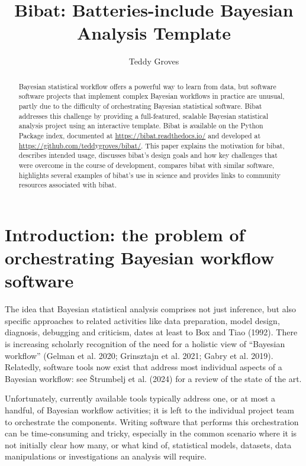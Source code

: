 \documentclass[
  letterpaper,
  DIV=11,
  numbers=noendperiod]{scrartcl}
\title{Bibat: Batteries-include Bayesian Analysis Template}
\author{Teddy Groves}
\date{}
\begin{document}
\maketitle
\begin{abstract}
Bayesian statistical workflow offers a powerful way to learn from data,
but software software projects that implement complex Bayesian workflows
in practice are unusual, partly due to the difficulty of orchestrating
Bayesian statistical software. Bibat addresses this challenge by
providing a full-featured, scalable Bayesian statistical analysis
project using an interactive template. Bibat is available on the Python
Package index, documented at \url{https://bibat.readthedocs.io/} and
developed at \url{https://github.com/teddygroves/bibat/}. This paper
explains the motivation for bibat, describes intended usage, discusses
bibat's design goals and how key challenges that were overcome in the
course of development, compares bibat with similar software, highlights
several examples of bibat's use in science and provides links to
community resources associated with bibat.
\end{abstract}

\section{Introduction: the problem of orchestrating Bayesian workflow
software}\label{introduction-the-problem-of-orchestrating-bayesian-workflow-software}

The idea that Bayesian statistical analysis comprises not just
inference, but also specific approaches to related activities like data
preparation, model design, diagnosis, debugging and criticism, dates at
least to Box and Tiao (1992). There is increasing scholarly recognition
of the need for a holistic view of ``Bayesian workflow'' (Gelman et al.
2020; Grinsztajn et al. 2021; Gabry et al. 2019). Relatedly, software
tools now exist that address most individual aspects of a Bayesian
workflow: see Štrumbelj et al. (2024) for a review of the state of the
art.

Unfortunately, currently available tools typically address one, or at
most a handful, of Bayesian workflow activities; it is left to the
individual project team to orchestrate the components. Writing software
that performs this orchestration can be time-consuming and tricky,
especially in the common scenario where it is not initially clear how
many, or what kind of, statistical models, datasets, data manipulations
or investigations an analysis will require.
\end{document}

